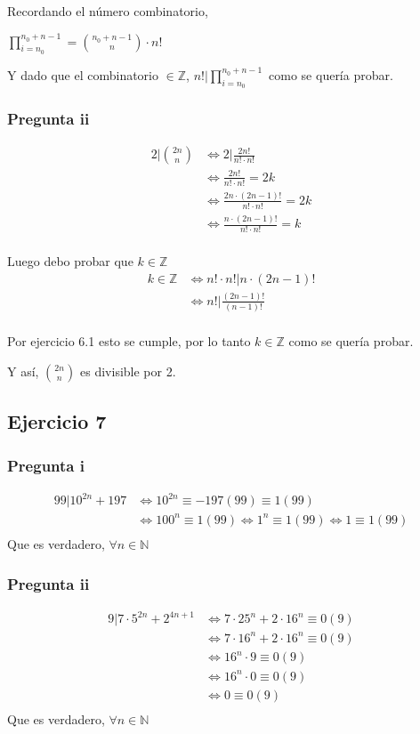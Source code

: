 Recordando el número combinatorio, 

$ \prod_{i = n_0}^{n_0 + n - 1} = \binom{n_0+n-1}{n} \cdot n! $

Y dado que el combinatorio $ \in \mathbb{Z} $, $ n! | \prod_{i = n_0}^{n_0 + n - 1} $ como se quería probar.

\subsubsection{Pregunta ii}
\begin{align*}
    2 | \binom{2n}{n} &\iff 2|\frac{2n!}{n!\cdot n!} \\
    &\iff \frac{2n!}{n!\cdot n!} = 2k \\
    &\iff \frac{2n \cdot (2n-1)!}{n!\cdot n!} = 2k \\
    &\iff \frac{n \cdot (2n-1)!}{n!\cdot n!} = k \\
\end{align*}

Luego debo probar que $k \in \mathbb{Z}$
\begin{align*}
    k \in \mathbb{Z} &\iff n!\cdot n! | n \cdot (2n-1)! \\
    &\iff n! | \frac{(2n-1)!}{(n-1)!} \\
\end{align*}

Por ejercicio 6.1 esto se cumple, por lo tanto $ k \in \mathbb{Z} $ como se quería probar.

Y así, $\binom{2n}{n}$ es divisible por 2.

\subsection{Ejercicio 7}
\subsubsection{Pregunta i}
\begin{align*}
    99 | 10^{2n} + 197 &\iff 10^{2n} \equiv -197(99) \equiv 1(99) \\
    &\iff 100^{n} \equiv 1(99) \iff 1^n \equiv 1(99) \iff 1 \equiv 1(99) \\
\end{align*}
Que es verdadero, $ \forall n \in \mathbb{N} $

\subsubsection{Pregunta ii}
\begin{align*}
    9| 7\cdot 5^{2n} + 2^{4n+1} &\iff 7\cdot 25^n + 2\cdot 16^n \equiv 0(9) \\
    &\iff 7\cdot 16^n + 2\cdot 16^n \equiv 0(9) \\
    &\iff 16^n \cdot 9 \equiv 0(9) \\
    &\iff 16^n \cdot 0 \equiv 0(9) \\
    &\iff 0 \equiv 0(9) \\
\end{align*}
Que es verdadero, $ \forall n \in \mathbb{N} $

